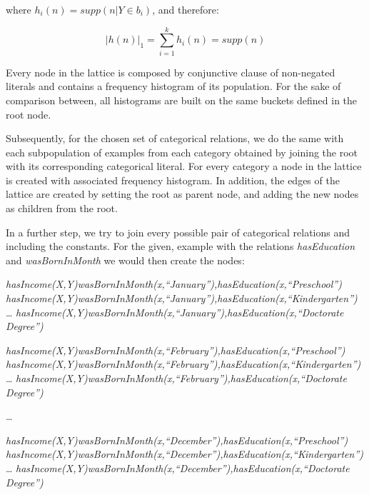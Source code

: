 where $h_i(n)=supp(n|Y \in b_i)$, and therefore:

\begin{equation}
  |h(n)|_1=\sum_{i=1}^{k}h_i(n)=supp(n)
\end{equation}

Every node in the lattice is composed by conjunctive clause of non-negated literals and contains a frequency histogram
of its population. For the sake of comparison between, all histograms are built on the same buckets defined in the
root
node. 

Subsequently, for the chosen set of categorical relations, we do the same with each subpopulation of examples from
each
category obtained by joining the root with its corresponding categorical literal. For every category a node in
the lattice is created with associated frequency histogram. In addition, the edges of the lattice are created by
setting the root as parent node, and adding the new nodes as children from the root.

In a further step, we try to join every possible pair of categorical relations and including the constants. For the
given, example with the relations \emph{hasEducation} and \emph{wasBornInMonth} we would then create the nodes:

  \emph{hasIncome(X,Y)wasBornInMonth(x,``January''),hasEducation(x,``Preschool'')} \newline
  \emph{hasIncome(X,Y)wasBornInMonth(x,``January''),hasEducation(x,``Kindergarten'')} \newline
  \dots \newline
  \emph{hasIncome(X,Y)wasBornInMonth(x,``January''),hasEducation(x,``Doctorate Degree'')} \newline

  \emph{hasIncome(X,Y)wasBornInMonth(x,``February''),hasEducation(x,``Preschool'')} \newline
  \emph{hasIncome(X,Y)wasBornInMonth(x,``February''),hasEducation(x,``Kindergarten'')} \newline
  \dots \newline
  \emph{hasIncome(X,Y)wasBornInMonth(x,``February''),hasEducation(x,``Doctorate Degree'')} \newline
 
  \dots \newline

  \emph{hasIncome(X,Y)wasBornInMonth(x,``December''),hasEducation(x,``Preschool'')} \newline
  \emph{hasIncome(X,Y)wasBornInMonth(x,``December''),hasEducation(x,``Kindergarten'')} \newline
  \dots \newline
  \emph{hasIncome(X,Y)wasBornInMonth(x,``December''),hasEducation(x,``Doctorate Degree'')} \newline


